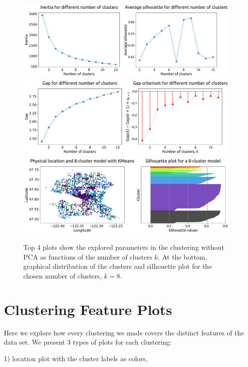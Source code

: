 \documentclass[12pt,a4paper]{article}
\begin{document}
\begin{figure}[ht!]
\centering
\includegraphics[width=\textwidth]{figs/NO_PCA_parfigs_1.pdf}
\includegraphics[width=\textwidth]{figs/NO_PCA_parfigs_2.pdf}
\includegraphics[width=\textwidth]{figs/NO_PCA_clusfigs_8_cluster.pdf}
\caption{Top 4 plots show the explored parameters in the clustering without PCA as functions of the number of clusters $k$. At the bottom, graphical distribution of the clusters and silhouette plot for the chosen number of clusters, $k = 8$.}
\label{NO_PCA_parfigs}
\end{figure}



\section{Clustering Feature Plots} \label{ClFePl}

Here we explore how every clustering we made covers the distinct features of the data set. We present 3 types of plots for each clustering:

1) location plot with the cluster labels as colors,
\end{document}
